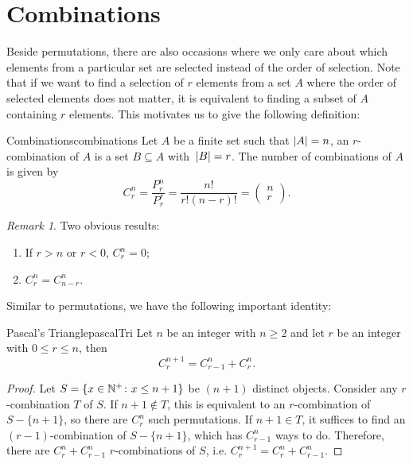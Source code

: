 \documentclass[math]{amznotes}
\theoremstyle{remark}
\newtheorem*{remark}{Remark}
\newcommand{\0}{\mathbf{0}}
\newcommand{\1}{\mathbf{1}}
\begin{document}
\section{Combinations}
Beside permutations, there are also occasions where we only care about which elements from a particular set are selected instead of the order of selection. Note that if we want to find a selection of $r$ elements from a set $A$ where the order of selected elements does not matter, it is equivalent to finding a subset of $A$ containing $r$ elements. This motivates us to give the following definition:
\begin{dfnbox}{Combinations}{combinations}
    Let $A$ be a finite set such that ${\left\lvert {A} \right\rvert} = n$, an $r$-combination of $A$ is a set $B \subseteq A$ with~${\left\lvert {B} \right\rvert} = r$. The number of combinations of $A$ is given by
    \begin{equation*}
        C^n_r = \frac{P^n_r}{P^r_r} = \frac{n!}{r!(n - r)!} = \begin{pmatrix}
            n \\
            r
        \end{pmatrix}.
    \end{equation*}
\end{dfnbox}
\begin{notebox}
    \begin{remark}
        Two obvious results:
        \begin{enumerate}
            \item If $r > n$ or $r < 0$, $C^n_r = 0$;
            \item $C^n_r = C^n_{n - r}$.
        \end{enumerate}
    \end{remark}
\end{notebox}
Similar to permutations, we have the following important identity:
\begin{thmbox}{Pascal's Triangle}{pascalTri}
    Let $n$ be an integer with $n \geq 2$ and let $r$ be an integer with $0 \leq r \leq n$, then
    \begin{equation*}
        C^{n + 1}_r = C^{n}_{r - 1} + C^{n}_r.
    \end{equation*}
    \tcblower
    \begin{proof}
        Let $S = \left\{x \in \mathbb{N}^+ \colon x \leq n + 1\right\}$ be $(n + 1)$ distinct objects. Consider any $r$-combination $T$ of $S$. If $n + 1 \notin T$, this is equivalent to an $r$-combination of~$S - \{n + 1\}$, so there are $C^n_r$ such permutations. If $n + 1 \in T$, it suffices to find an $(r - 1)$-combination of $S - \{n + 1\}$, which has $C^n_{r - 1}$ ways to do. Therefore, there are $C^n_{r} + C^n_{r - 1}$ $r$-combinations of $S$, i.e. $C^{n + 1}_r = C^n_r + C^n_{r - 1}$. 
    \end{proof}
\end{thmbox}
\end{document}
